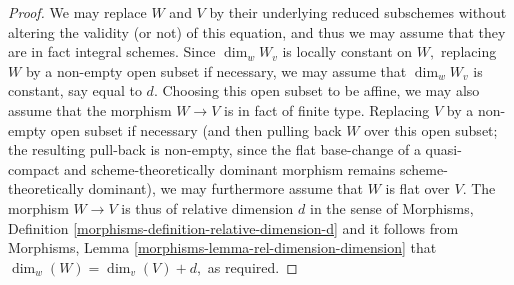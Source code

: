 \begin{proof}
\medskip\noindent
We may replace $W$ and $V$ by their underlying reduced subschemes
without altering the validity (or not) of this equation,
and thus we may assume that they are in fact integral schemes.
Since $\dim_w W_v$ is locally constant on $W,$ replacing $W$
by a non-empty open subset if necessary, we may assume that $\dim_w W_v$
is constant, say equal to $d$.  Choosing this open subset to be affine,
we may also assume that the morphism $W\to V$ is in fact of finite type.
Replacing $V$ by a non-empty open subset if necessary
(and then pulling back $W$ over this open subset; the resulting pull-back
is non-empty, since the flat base-change of a quasi-compact
and scheme-theoretically
dominant morphism remains scheme-theoretically dominant),
we may furthermore assume that $W$ is flat over $V$.
The morphism $W\to V$ is thus of relative dimension $d$
in the sense of
Morphisms, Definition
\ref{morphisms-definition-relative-dimension-d}
and it follows from
Morphisms, Lemma \ref{morphisms-lemma-rel-dimension-dimension}
that $\dim_w(W) = \dim_v(V) + d,$ as required.
\end{proof}
